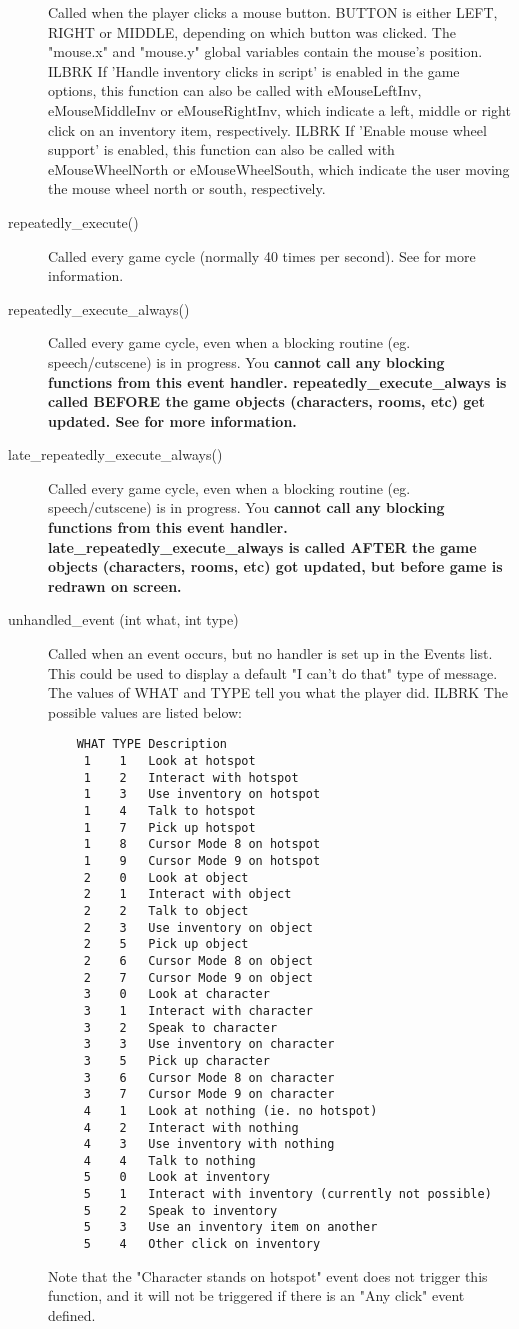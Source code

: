 \begin{description}
  Called when the player clicks a mouse button. BUTTON is either LEFT,
  RIGHT or MIDDLE, depending on which button was clicked. The "mouse.x" and "mouse.y"
  global variables contain the mouse's position. ILBRK
  If 'Handle inventory clicks in script' is enabled in the game options, this
  function can also be called with eMouseLeftInv, eMouseMiddleInv or eMouseRightInv, which
  indicate a left, middle or right click on an inventory item, respectively. ILBRK
  If 'Enable mouse wheel support' is enabled, this function can also be called with
  eMouseWheelNorth or eMouseWheelSouth, which indicate the user moving the mouse wheel north or
  south, respectively.
\item [repeatedly_execute()]
  Called every game cycle (normally 40 times per second).
  See  for more information.
\item [repeatedly_execute_always()]
  Called every game cycle, even when a blocking routine (eg. speech/cutscene) is in
  progress. You \bf{cannot} call any blocking functions from this event handler.
  \bf{repeatedly_execute_always} is called \bf{BEFORE} the game objects (characters, rooms, etc) get updated.
  See  for more information.
\item [late_repeatedly_execute_always()]
  Called every game cycle, even when a blocking routine (eg. speech/cutscene) is in
  progress. You \bf{cannot} call any blocking functions from this event handler.
  \bf{late_repeatedly_execute_always} is called \bf{AFTER} the game objects (characters, rooms, etc) got updated, but before game is redrawn on screen.
\item [unhandled_event (int what, int type)]
  Called when an event occurs, but no handler is set up in the Events list.
  This could be used to display a default "I can't do that" type of message.
  The values of WHAT and TYPE tell you what the player did. ILBRK
  The possible values are listed below:\begin{verbatim}
	WHAT TYPE Description
	 1    1   Look at hotspot
	 1    2   Interact with hotspot
	 1    3   Use inventory on hotspot
	 1    4   Talk to hotspot
	 1    7   Pick up hotspot
	 1    8   Cursor Mode 8 on hotspot
	 1    9   Cursor Mode 9 on hotspot
	 2    0   Look at object
	 2    1   Interact with object
	 2    2   Talk to object
	 2    3   Use inventory on object
	 2    5   Pick up object
	 2    6   Cursor Mode 8 on object
	 2    7   Cursor Mode 9 on object
	 3    0   Look at character
	 3    1   Interact with character
	 3    2   Speak to character
	 3    3   Use inventory on character
	 3    5   Pick up character
	 3    6   Cursor Mode 8 on character
	 3    7   Cursor Mode 9 on character
	 4    1   Look at nothing (ie. no hotspot)
	 4    2   Interact with nothing
	 4    3   Use inventory with nothing
	 4    4   Talk to nothing
	 5    0   Look at inventory
	 5    1   Interact with inventory (currently not possible)
	 5    2   Speak to inventory
	 5    3   Use an inventory item on another
	 5    4   Other click on inventory\end{verbatim}
  Note that the "Character stands on hotspot" event does not trigger this
  function, and it will not be triggered if there is an "Any click" event defined.


\end{description}

